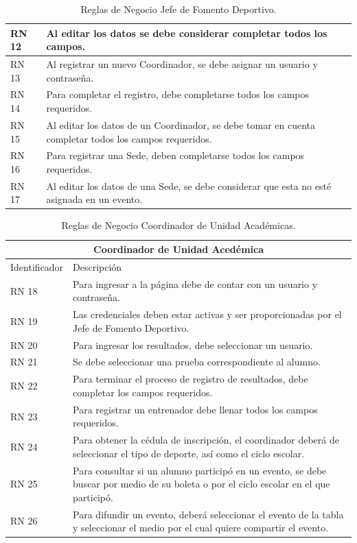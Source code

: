 \begin{table}[hbt!]
\begin{center}
\begin{tabular}{|p{30mm}|p{100mm}|}
			RN 12 & Al editar los datos se debe considerar completar todos los campos.\\ \hline
			RN 13 &  Al registrar un nuevo Coordinador, se debe asignar un usuario y contraseña.\\ \hline
			RN 14 &  Para completar el registro, debe completarse todos los campos requeridos.\\ \hline
			RN 15 &  Al editar los datos de un Coordinador, se debe tomar en cuenta completar todos los campos requeridos.\\ \hline
			RN 16 &  Para registrar una Sede, deben completarse todos los campos requeridos.\\ \hline
			RN 17 &  Al editar los datos de una Sede, se debe considerar que esta no esté asignada en un evento.\\ \hline
		\end{tabular}
		\caption{Reglas de Negocio Jefe de Fomento Deportivo.}
		\label{RNJFD}
	\end{center}
\end{table}

\begin{table}[hbt!]
	\begin{center}
		\begin{tabular}{|p{30mm}|p{100mm}|}
			\hline
			\multicolumn{2}{|c|}{Coordinador de Unidad Acedémica} \\
			\hline
			Identificador & Descripción \\
			\hline 
			RN 18 &  Para ingresar a la página debe de contar con un usuario y contraseña.\\ \hline
			RN 19 & Las credenciales deben estar activas y ser proporcionadas por el Jefe de Fomento Deportivo.\\ \hline
			RN 20 & Para ingresar los resultados, debe seleccionar un usuario. \\ \hline
			RN 21 & Se debe seleccionar una prueba correspondiente al alumno.\\ \hline
			RN 22 & Para terminar el proceso de registro de resultados, debe completar los campos requeridos. \\ \hline
			RN 23 & Para registrar un entrenador debe llenar todos los campos requeridos.\\ \hline
			RN 24 & Para obtener la cédula de inscripción, el coordinador deberá de seleccionar el tipo de deporte, así como el ciclo escolar. \\ \hline
			RN 25 & Para consultar si un alumno participó en un evento, se debe buscar por medio de su boleta o por el ciclo escolar en el que participó.\\ \hline
			RN 26 & Para difundir un evento, deberá seleccionar el evento de la tabla y seleccionar el medio por el cual quiere compartir el evento.\\ \hline
		\end{tabular}
		\caption{Reglas de Negocio Coordinador de Unidad Académicas.}
		\label{RNCUA}
	\end{center}
\end{table}

